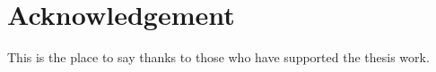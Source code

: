 

\chapter*{Acknowledgement}
\thispagestyle{empty}
This is the place to say thanks to those who have supported the thesis work.
